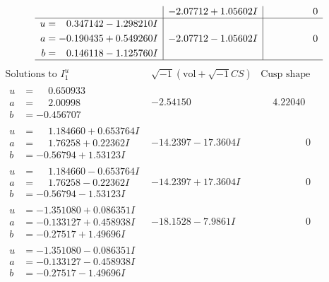 \documentclass[1p]{elsarticle_modified}
\theoremstyle{definition}
\newcommand{\I}{\sqrt{-1}}
\begin{document}
$$\begin{array}{c|c|c}
 & -2.07712 + 1.05602 I & \phantom{-0.000000 } 0 \\ \hline\begin{aligned}
u &= \phantom{-}0.347142 - 1.298210 I \\
a &= -0.190435 + 0.549260 I \\
b &= \phantom{-}0.146118 - 1.125760 I\end{aligned}
 & -2.07712 - 1.05602 I & \phantom{-0.000000 } 0\\
 \hline 
 \end{array}$$\newpage$$\begin{array}{c|c|c}  
\text{Solutions to }I^u_{1}& \I (\text{vol} + \sqrt{-1}CS) & \text{Cusp shape}\\
 \hline 
\begin{aligned}
u &= \phantom{-}0.650933\phantom{ +0.000000I} \\
a &= \phantom{-}2.00998\phantom{ +0.000000I} \\
b &= -0.456707\phantom{ +0.000000I}\end{aligned}
 & -2.54150\phantom{ +0.000000I} & \phantom{-}4.22040\phantom{ +0.000000I} \\ \hline\begin{aligned}
u &= \phantom{-}1.184660 + 0.653764 I \\
a &= \phantom{-}1.76258 + 0.22362 I \\
b &= -0.56794 + 1.53123 I\end{aligned}
 & -14.2397 - 17.3604 I & \phantom{-0.000000 } 0 \\ \hline\begin{aligned}
u &= \phantom{-}1.184660 - 0.653764 I \\
a &= \phantom{-}1.76258 - 0.22362 I \\
b &= -0.56794 - 1.53123 I\end{aligned}
 & -14.2397 + 17.3604 I & \phantom{-0.000000 } 0 \\ \hline\begin{aligned}
u &= -1.351080 + 0.086351 I \\
a &= -0.133127 + 0.458938 I \\
b &= -0.27517 + 1.49696 I\end{aligned}
 & -18.1528 - 7.9861 I & \phantom{-0.000000 } 0 \\ \hline\begin{aligned}
u &= -1.351080 - 0.086351 I \\
a &= -0.133127 - 0.458938 I \\
b &= -0.27517 - 1.49696 I\end{aligned}

\end{array}$$
\end{document}
